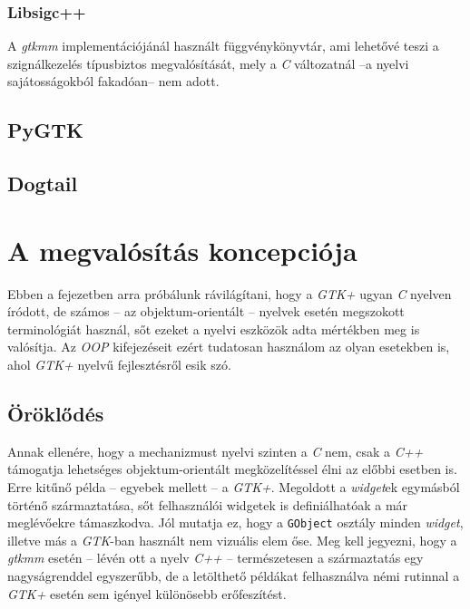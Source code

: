 \subsubsection{Libsigc++}

A \textit{gtkmm} implementációjánál használt függvénykönyvtár, ami lehetővé teszi a szignálkezelés típusbiztos megvalósítását, mely a \textit{C} változatnál --a nyelvi sajátosságokból fakadóan-- nem adott.

\subsection{PyGTK}


\subsection{Dogtail}

\section{A megvalósítás koncepciója}

Ebben a fejezetben arra próbálunk rávilágítani, hogy a \textit{GTK+} ugyan \textit{C} nyelven íródott, de számos -- az objektum-orientált -- nyelvek esetén megszokott terminológiát használ, sőt ezeket a nyelvi eszközök adta mértékben meg is valósítja. Az \textit{OOP} kifejezéseit ezért tudatosan használom az olyan esetekben is, ahol \textit{GTK+} nyelvű fejlesztésről esik szó.

\subsection{Öröklődés}

Annak ellenére, hogy a mechanizmust nyelvi szinten a \textit{C} nem, csak a \textit{C++} támogatja lehetséges objektum-orientált megközelítéssel élni az előbbi esetben is. Erre kitűnő példa -- egyebek mellett -- a \textit{GTK+}. Megoldott a \textit{widget}ek egymásból történő származtatása, sőt felhasználói widgetek is definiálhatóak a már meglévőekre támaszkodva. Jól mutatja ez, hogy a \texttt{GObject} osztály minden \textit{widget}, illetve más a \textit{GTK}-ban használt nem vizuális elem őse. Meg kell jegyezni, hogy a \textit{gtkmm} esetén -- lévén ott a nyelv \textit{C++} -- természetesen a származtatás egy nagyságrenddel egyszerűbb, de a letölthető példákat felhasználva némi rutinnal a \textit{GTK+} esetén sem igényel különösebb erőfeszítést.


